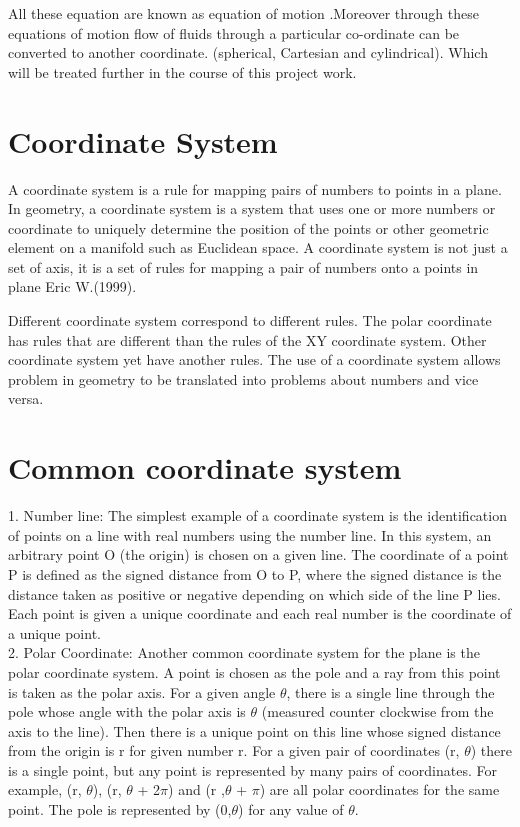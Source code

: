 \documentclass[a4paper, 12pt]{report}
\begin{document}
 All these equation are known as equation of motion .Moreover through these equations of motion flow of fluids through a particular co-ordinate can be converted to another coordinate. (spherical, Cartesian and cylindrical). Which will be treated further in the course of this project work.

\section{Coordinate System}
A coordinate system is a rule for mapping pairs of numbers to points in a plane.\newline
In geometry, a coordinate system is a system that uses one or more numbers or coordinate to uniquely determine the position of the points or other geometric element on a manifold such as Euclidean space.
A coordinate system is not just a set of axis, it is a set of rules for mapping a pair of numbers onto a points in plane Eric W.(1999).


Different coordinate system correspond to different rules. The polar coordinate has rules that are different than the rules of the XY coordinate system. Other coordinate system yet have another rules.
The use of a coordinate system allows problem in geometry to be translated into problems about numbers and vice versa.

\section{Common coordinate system}
1. Number line:
The simplest example of a coordinate system is the identification of points on a line with real numbers using the number line. In this system, an arbitrary point O (the origin) is chosen on a given line. The coordinate of a point P is defined as the signed distance from O to P, where the signed distance is the distance taken as positive or negative depending on which side of the line P lies. Each point is given a unique coordinate and each real number is the coordinate of a unique point.\\

2.	Polar Coordinate:
Another common coordinate system for the plane is the polar coordinate system. A point is chosen as the pole and a ray from this point is taken as the polar axis. For a given angle  $\theta$, there is a single line through the pole whose angle with the polar axis is  $\theta$ (measured counter clockwise from the axis to the line). Then there is a unique point on this line whose signed distance from the origin is r for given number r. For a given pair of coordinates (r, $\theta$) there is a single point, but any point is represented by many pairs of coordinates. For example, (r, $\theta$), (r, $\theta$ + 2$\pi$) and (r ,$\theta$ + $\pi$) are all polar coordinates for the same point. The pole is represented by (0,$\theta$) for any value of  $\theta$.\\
\end{document}
